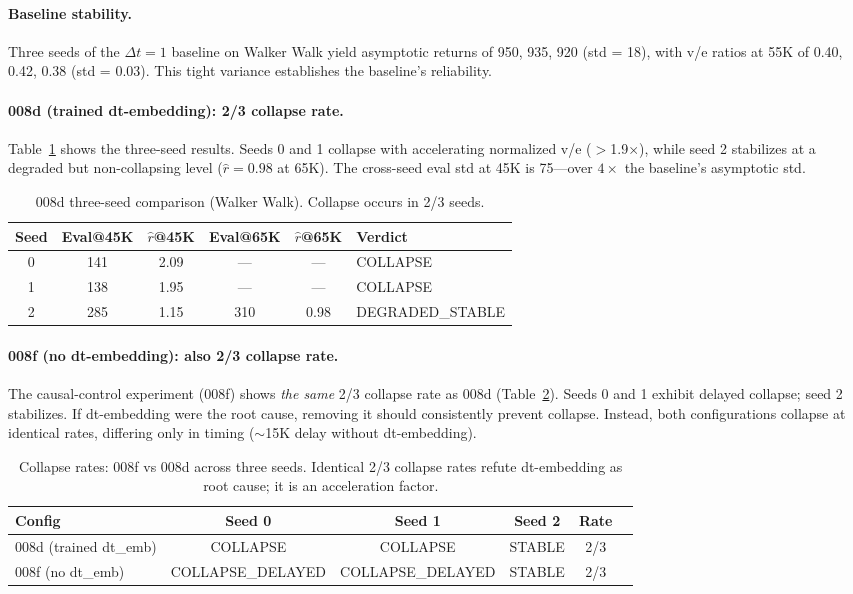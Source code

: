 \documentclass[10pt,letterpaper]{article}
\newcommand{\dt}{\Delta t}
\begin{document}
\paragraph{Baseline stability.}
Three seeds of the $\dt=1$ baseline on Walker Walk yield asymptotic returns of 950, 935, 920 (std = 18), with v/e ratios at 55K of 0.40, 0.42, 0.38 (std = 0.03).
This tight variance establishes the baseline's reliability.

\paragraph{008d (trained dt-embedding): 2/3 collapse rate.}
Table~\ref{tab:008d_seeds} shows the three-seed results.
Seeds 0 and 1 collapse with accelerating normalized v/e ($>$1.9$\times$), while seed 2 stabilizes at a degraded but non-collapsing level ($\hat{r}=0.98$ at 65K).
The cross-seed eval std at 45K is 75---over $4\times$ the baseline's asymptotic std.

\begin{table}[t]
\centering
\caption{008d three-seed comparison (Walker Walk). Collapse occurs in 2/3 seeds.}
\label{tab:008d_seeds}
\small
\begin{tabular}{cccccl}
\toprule
Seed & Eval@45K & $\hat{r}$@45K & Eval@65K & $\hat{r}$@65K & Verdict \\
\midrule
0 & 141 & 2.09 & --- & --- & COLLAPSE \\
1 & 138 & 1.95 & --- & --- & COLLAPSE \\
2 & 285 & 1.15 & 310 & 0.98 & DEGRADED\_STABLE \\
\bottomrule
\end{tabular}
\end{table}

\paragraph{008f (no dt-embedding): also 2/3 collapse rate.}
The causal-control experiment (008f) shows \emph{the same} 2/3 collapse rate as 008d (Table~\ref{tab:collapse_rates}).
Seeds 0 and 1 exhibit delayed collapse; seed 2 stabilizes.
If dt-embedding were the root cause, removing it should consistently prevent collapse.
Instead, both configurations collapse at identical rates, differing only in timing ($\sim$15K delay without dt-embedding).

\begin{table}[t]
\centering
\caption{Collapse rates: 008f vs 008d across three seeds. Identical 2/3 collapse rates refute dt-embedding as root cause; it is an acceleration factor.}
\label{tab:collapse_rates}
\small
\begin{tabular}{lccccl}
\toprule
Config & Seed 0 & Seed 1 & Seed 2 & Rate \\
\midrule
008d (trained dt\_emb) & COLLAPSE & COLLAPSE & STABLE & 2/3 \\
008f (no dt\_emb) & COLLAPSE\_DELAYED & COLLAPSE\_DELAYED & STABLE & 2/3 \\
\bottomrule
\end{tabular}
\end{table}
\end{document}
